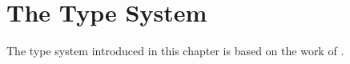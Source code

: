 \chapter{The Type System}

The type system introduced in this chapter is based on the work of \cite{Paykin2016TheEO}.


